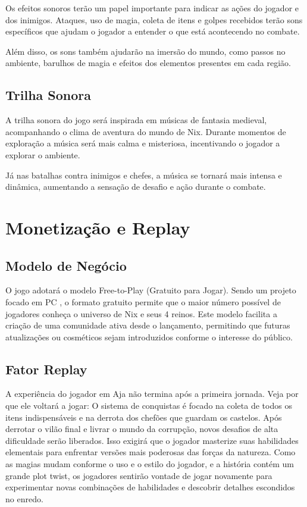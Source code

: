 \documentclass[12pt, a4paper]{article} %
\begin{document}
	Os efeitos sonoros terão um papel importante para indicar as ações do jogador e dos inimigos. Ataques, uso de magia, coleta de itens e golpes recebidos terão sons específicos que ajudam o jogador a entender o que está acontecendo no combate.
	
	Além disso, os sons também ajudarão na imersão do mundo, como passos no ambiente, barulhos de magia e efeitos dos elementos presentes em cada região.
	
	\subsection{Trilha Sonora}
	
	A trilha sonora do jogo será inspirada em músicas de fantasia medieval, acompanhando o clima de aventura do mundo de Nix. Durante momentos de exploração a música será mais calma e misteriosa, incentivando o jogador a explorar o ambiente.
	
	Já nas batalhas contra inimigos e chefes, a música se tornará mais intensa e dinâmica, aumentando a sensação de desafio e ação durante o combate.
	
	\newpage
	
	
	\section{Monetização e Replay}
	
	\subsection{Modelo de Negócio}
	
	O jogo adotará o modelo Free-to-Play (Gratuito para Jogar).
	Sendo um projeto focado em PC , o formato gratuito permite que o maior número possível de jogadores conheça o universo de Nix e seus 4 reinos.
	Este modelo facilita a criação de uma comunidade ativa desde o lançamento, permitindo que futuras atualizações ou cosméticos sejam introduzidos conforme o interesse do público.
	
	\subsection{Fator Replay}
	
	A experiência do jogador em Aja não termina após a primeira jornada. Veja por que ele voltará a jogar:
	O sistema de conquistas é focado na coleta de todos os itens indispensáveis e na derrota dos chefões que guardam os castelos. 
	Após derrotar o vilão final e livrar o mundo da corrupção, novos desafios de alta dificuldade serão liberados. Isso exigirá que o jogador masterize suas habilidades elementais para enfrentar versões mais poderosas das forças da natureza.
	Como as magias mudam conforme o uso e o estilo do jogador, e a história contém um grande plot twist, os jogadores sentirão vontade de jogar novamente para experimentar novas combinações de habilidades e descobrir detalhes escondidos no enredo.
	
\end{document}
